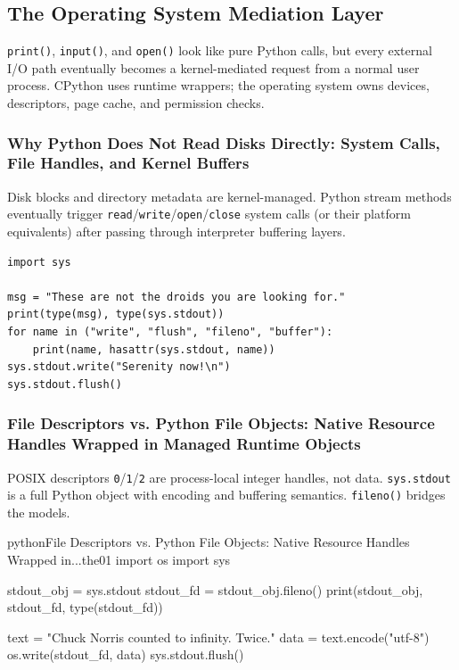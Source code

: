 \subsection{The Operating System Mediation Layer}

\texttt{print()}, \texttt{input()}, and \texttt{open()} look like pure Python calls, but every external I/O path eventually becomes a kernel-mediated request from a normal user process. CPython uses runtime wrappers; the operating system owns devices, descriptors, page cache, and permission checks.

\subsubsection{Why Python Does Not Read Disks Directly: System Calls, File Handles, and Kernel Buffers}

Disk blocks and directory metadata are kernel-managed. Python stream methods eventually trigger \texttt{read}/\texttt{write}/\texttt{open}/\texttt{close} system calls (or their platform equivalents) after passing through interpreter buffering layers.

\begin{verbatim}
import sys

msg = "These are not the droids you are looking for."
print(type(msg), type(sys.stdout))
for name in ("write", "flush", "fileno", "buffer"):
    print(name, hasattr(sys.stdout, name))
sys.stdout.write("Serenity now!\n")
sys.stdout.flush()
\end{verbatim}

\subsubsection{File Descriptors vs. Python File Objects: Native Resource Handles Wrapped in Managed Runtime Objects}

POSIX descriptors \texttt{0}/\texttt{1}/\texttt{2} are process-local integer handles, not data. \texttt{sys.stdout} is a full Python object with encoding and buffering semantics. \texttt{fileno()} bridges the models.

\begin{codebox}[]{python}{File Descriptors vs. Python File Objects: Native Resource Handles Wrapped in...}{the01}
import os
import sys

stdout_obj = sys.stdout
stdout_fd = stdout_obj.fileno()
print(stdout_obj, stdout_fd, type(stdout_fd))

text = "Chuck Norris counted to infinity. Twice.\n"
data = text.encode("utf-8")
os.write(stdout_fd, data)
sys.stdout.flush()
\end{codebox}


